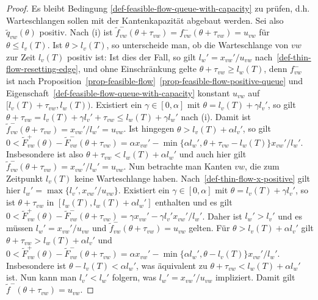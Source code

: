 \begin{proof}
	Es bleibt Bedingung \ref{def-feasible-flow-queue-with-capacity} zu prüfen, d.h. Warteschlangen sollen mit der Kantenkapazität abgebaut werden.
	Sei also $\tilde{q}_{vw}(\theta)$ positiv.
	Nach (i) ist $\tilde{f}_{vw}^-(\theta + \tau_{vw}) = f_{vw}^-(\theta + \tau_{vw}) = u_{vw}$ für $\theta\leq l_v(T)$.
	Ist $\theta > l_v(T)$, so unterscheide man, ob die Warteschlange von $vw$ zur Zeit $l_v(T)$ positiv ist:
	Ist dies der Fall, so gilt $l_w' = x_{vw}' / u_{vw}$ nach~\ref{def-thin-flow-resetting-edge}, und ohne Einschränkung gelte $\theta + \tau_{vw} \geq l_w(T)$, denn $f_{vw}^-$ ist nach Proposition~\ref{prop-feasible-flow}~\ref{prop-feasible-flow-positive-queue} und Eigenschaft~\ref{def-feasible-flow-queue-with-capacity} konstant $u_{vw}$ auf $[l_v(T)+\tau_{vw},l_w(T))$.
	Existiert ein $\gamma\in [0, \alpha]$ mit $\theta = l_v(T) + \gamma l_v'$, so gilt $\theta + \tau_{vw} = l_v(T) + \gamma l_v' + \tau_{vw} \leq l_w(T) + \gamma l_w'$ nach (i).
	Damit ist $\tilde{f}^-_{vw}(\theta + \tau_{vw}) = x_{vw}'/l_w' = u_{vw}$.
	Ist  hingegen $\theta > l_v(T) + \alpha l_v'$, so gilt $0<\tilde{F}^+_{vw}(\theta) - \tilde{F}_{vw}^-(\theta +\tau_{vw}) = \alpha x_{vw}' - \min \{ \alpha l_w', \theta + \tau_{vw} - l_w(T) \} x_{vw}' / l_w'$. Insbesondere ist also $\theta + \tau_{vw} < l_w(T) + \alpha l_w'$ und auch hier gilt $\tilde{f}^-_{vw}(\theta + \tau_{vw}) = x_{vw}'/l_w' = u_{vw}$.	
	Nun betrachte man Kanten $vw$, die zum Zeitpunkt $l_v(T)$ keine Warteschlange haben.
	Nach~\ref{def-thin-flow-x-positive} gilt hier $l_w' = \max \{ l_v', x_{vw}' / u_{vw}  \}$.
	Existiert ein $\gamma\in [0, \alpha]$ mit $\theta = l_v(T) + \gamma l_v'$, so ist $\theta+\tau_{vw}$ in $[l_w(T), l_w(T) + \alpha l_w']$ enthalten und es gilt $0<\tilde{F}_{vw}^+(\theta) - \tilde{F}_{vw}^-(\theta + \tau_{vw})= \gamma x_{vw}' - \gamma l_v' x_{vw}'/l_w'$.
	Daher ist $l_w' > l_v'$ und es müssen $l_w' = x_{vw}'/u_{vw}$ und $\tilde{f}_{vw}^-(\theta + \tau_{vw}) = u_{vw}$ gelten.
	Für $\theta > l_v(T) + \alpha l_v'$ gilt $\theta + \tau_{vw} > l_w(T) + \alpha l_v'$ und $0 < \tilde{F}_{vw}^+(\theta) - \tilde{F}_{vw}^-(\theta + \tau_{vw}) = \alpha x_{vw}' - \min \{ \alpha l_w', \theta - l_v(T) \}x_{vw}'/l_w'$.
	Insbesondere ist $\theta - l_v(T) < \alpha l_w'$, was äquivalent zu $\theta + \tau_{vw} < l_w(T) + \alpha l_w'$ ist.
	Nun kann man $l_v' < l_w'$ folgern, was $l_w' = x_{vw}'/u_{vw}$ impliziert.
	Damit gilt $\tilde{f}^-(\theta + \tau_{vw}) = u_{vw}$.
	

\end{proof}
